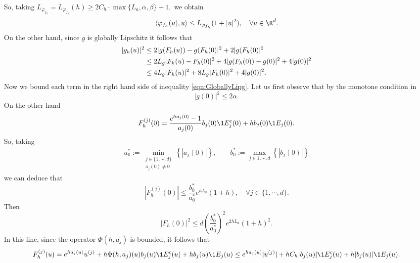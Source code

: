 \documentclass[3p]{elsarticle}
\theoremstyle{definition}
\theoremstyle{plain}%
\theoremstyle{remark}
\newcommand{\innerprod}[2]{\left\langle#1, #2\right\rangle}
\begin{document}
\begin{pf}
	So, taking 
	$
		L_{\varphi_{f_h}} = L_{\varphi_{f_h}}(h) \geq 2 C_h \cdot \max\{L_a, \alpha, \beta\} + 1,
	$ 
	we obtain
	\begin{equation}\label{eqn:VarphifhDotProdBound}
		\innerprod{ \varphi_{f_h}(u)}{u}
		\leq 
			L_{\varphi_{f_h}} (1+|u|^2), \quad \forall u \in \R^d.
	\end{equation}
	On the other hand, since $g$ is globally Lipschitz it follows that
	\begin{align}\label{eqn:GloballyLipg}
		|g_h(u)|^2 
		&\leq
			2 |g(F_h(u)) - g(F_h(0)|^2  + 2 | g(F_h(0)|^2 \notag \\
		&\leq 
			2 L_g |F_h(u) - F_h(0)|^2  + 4 |g(F_h(0)) - g(0)|^2 + 4 |g(0)|^2 \notag\\ 
		&\leq 
			4 L_g |F_h(u)|^2  + 8 L_g |F_h(0)|^2  + 4 |g(0)|^2 .
	\end{align}
	Now we bound each term in the right hand side of inequality \eqref{eqn:GloballyLipg}.
	Let us first observe that by the monotone condition in 
	\begin{equation} \label{eqn:Boundgzero}
		|g(0)|^2 \leq 2\alpha.
	\end{equation}
	On the other hand 
	\begin{align*}
		F_h^{(j)} (0) =
			\frac{e^{h a_j(0)}-1}{a_j(0)} b_j(0) \1{E_j^c}(0) + hb_j(0) \1{E_j}(0).
	\end{align*}
	So, taking
	\begin{align*}
		a^*_0 := 
			\min_{
				\substack{
					j \in \{1, \cdots, d \}\\
					a_j(0) \neq 0
				}
			}
			\left\{
				|a_j(0)|
			\right\},
			\qquad
		b^*_0 :=
			\max_{
				j\in {1,\cdots, d}
			}
			\left\{
				|b_j(0)|
			\right\}
	\end{align*}
	we can deduce that
	\begin{equation*}
		|F_h^{(j)}(0)| 
			\leq
			\frac{b_0^*}{a_0^*}
			e^{h L_a} (1+h),
			\quad
			\forall j \in \{1, \cdots, d\}.  
	\end{equation*}
	Then
	\begin{equation} \label{eqn:BoundFhZero}
		|F_h(0)|^2 
			\leq
			d\left(
				\frac{b_0^*}{a_0^*}
			\right)^2
		e^{2h L_a} (1+h)^2.
	\end{equation}
	In this line, since the operator $\Phi(h,a_j)$ is bounded, it follows that
	\begin{dmath*}
		F_h^{(j)}(u) 
			=
			e^{h a_j(u)} u^{(j)} +
			h \Phi(h, a_j)(u) b_j(u) \1{E_j^c}(u) +h b_j(u) \1{E_j}(u)
			\leq
			e^{h a_j(u)} |u^{(j)}| +
			h C_h |b_j(u)| \1{E_j^c}(u) +h |b_j(u)| \1{E_j}(u).

\end{dmath*}
\end{pf}
\end{document}
